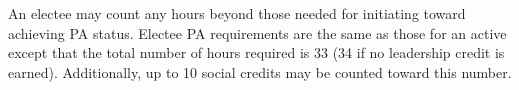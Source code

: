 An electee may count any
hours beyond those needed for initiating toward achieving PA status. Electee PA requirements
are the same as those for an active except that the total number of hours required
is 33 (34 if no leadership credit is earned). Additionally, up to 10 social credits may be
counted toward this number.




